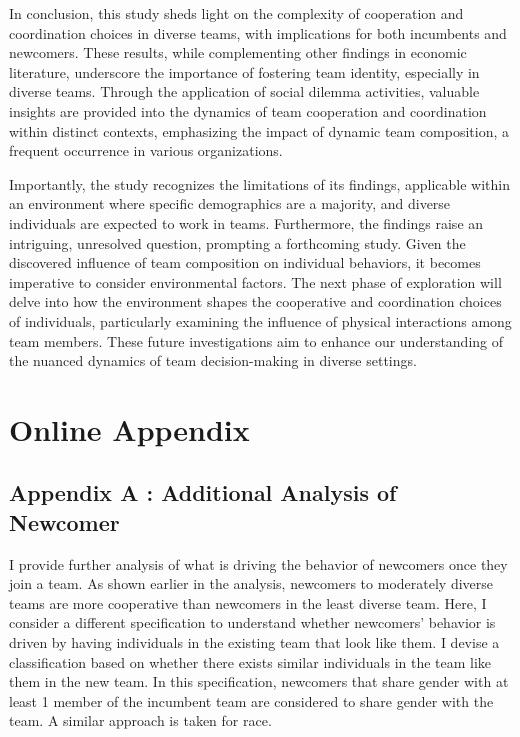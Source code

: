 In conclusion, this study sheds light on the complexity of cooperation and coordination choices in diverse teams, with implications for both incumbents and newcomers. These results, while complementing other findings in economic literature, underscore the importance of fostering team identity, especially in diverse teams. Through the application of social dilemma activities, valuable insights are provided into the dynamics of team cooperation and coordination within distinct contexts, emphasizing the impact of dynamic team composition, a frequent occurrence in various organizations.

Importantly, the study recognizes the limitations of its findings, applicable within an environment where specific demographics are a majority, and diverse individuals are expected to work in teams. Furthermore, the findings raise an intriguing, unresolved question, prompting a forthcoming study. Given the discovered influence of team composition on individual behaviors, it becomes imperative to consider environmental factors. The next phase of exploration will delve into how the environment shapes the cooperative and coordination choices of individuals, particularly examining the influence of physical interactions among team members. These future investigations aim to enhance our understanding of the nuanced dynamics of team decision-making in diverse settings.



\section{Online Appendix}
 
\subsection{Appendix A : Additional Analysis of Newcomer } \label{sec:App}
I provide further analysis of what is driving the behavior of newcomers once they join a team. As shown earlier in the analysis, newcomers to moderately diverse teams are more cooperative than newcomers in the least diverse team. Here, I consider a different specification to understand whether newcomers' behavior is driven by having individuals in the existing team that look like them. I devise a classification based on whether there exists similar individuals in the team like them in the new team. In this specification, newcomers that share gender with at least 1 member of the incumbent team are considered to share gender with the team. A similar approach is taken for race.

